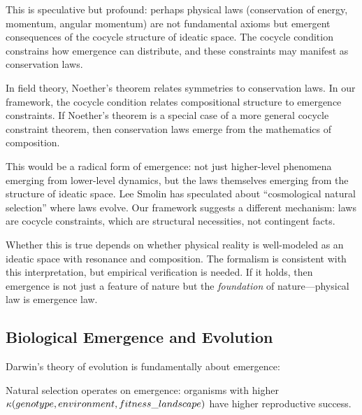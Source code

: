 \begin{interpretation}
This is speculative but profound: perhaps physical laws (conservation of energy,
momentum, angular momentum) are not fundamental axioms but emergent consequences
of the cocycle structure of ideatic space. The cocycle condition constrains how
emergence can distribute, and these constraints may manifest as conservation laws.

In field theory, Noether's theorem relates symmetries to conservation laws. In
our framework, the cocycle condition relates compositional structure to emergence
constraints. If Noether's theorem is a special case of a more general cocycle
constraint theorem, then conservation laws emerge from the mathematics of
composition.

This would be a radical form of emergence: not just higher-level phenomena
emerging from lower-level dynamics, but the laws themselves emerging from the
structure of ideatic space. Lee Smolin has speculated about ``cosmological
natural selection'' where laws evolve. Our framework suggests a different
mechanism: laws are cocycle constraints, which are structural necessities, not
contingent facts.

Whether this is true depends on whether physical reality is well-modeled as an
ideatic space with resonance and composition. The formalism is consistent with
this interpretation, but empirical verification is needed. If it holds, then
emergence is not just a feature of nature but the \emph{foundation} of nature---physical
law is emergence law.
\end{interpretation}


\subsection{Biological Emergence and Evolution}

Darwin's theory of evolution is fundamentally about emergence:

\begin{theorem}
\label{thm:evolutionary-emergence}
Natural selection operates on emergence: organisms with higher
$\kappa(genotype, environment, fitness\_landscape)$ have higher reproductive
success.
\end{theorem}

